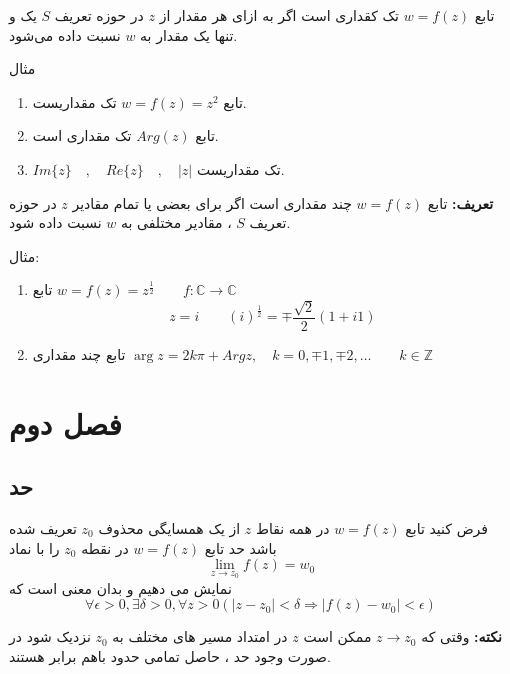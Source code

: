 \documentclass[12pt]{report}
\begin{document}
	 	 	 	 تابع 
	 	 	 	 $w = f(z)$
	 	 	 	 تک کقداری است اگر به ازای هر مقدار از 
	 	 	 	 $z$
	 	 	 	 در حوزه تعریف 
	 	 	 	 $S$
	 	 	 	 یک و تنها یک  مقدار  به 
	 	 	 	 $w$
	 	 	 	 نسبت داده می‌شود.
	 	 	 	 
	 	 	 	 مثال
	 	 	 	 \begin{enumerate}
	 	 	 	 	\item 
	 	 	 	 	تابع
	 	 	 	 	$w=f(z) = z^2$
	 	 	 	 	تک مقداریست.
	 	 	 	 	\item
	 	 	 	 	تابع 
	 	 	 	 	$Arg(z)$
	 	 	 	 	تک مقداری است.
	 	 	 	 	\item
	 	 	 	 	$Im\{z\} \quad, \quad Re\{z\} \quad , \quad |z|$
	 	 	 	 	تک مقداریست.
	 	 	 	 	
	 	 	 	 \end{enumerate}
 	 	 	 \textbf{تعریف:}
 	 	 	 تابع 
 	 	 	 $w = f(z)$
 	 	 	 چند مقداری است اگر برای بعضی یا تمام مقادیر 
 	 	 	 $z$
 	 	 	 در حوزه تعریف
 	 	 	 $S$
 	 	 	 ،
 	 	 	 مقادیر مختلفی به 
 	 	 	 $w$
 	 	 	 نسبت داده شود.
 	 	 	 
 	 	 	 مثال:
 	 	 	 \begin{enumerate}
 	 	 	 	\item 
 	 	 	 	تابع 
 	 	 	 	$w = f(z) = z^{\frac{1}{2}}\qquad f: \mathbb{C} \rightarrow \mathbb{C}$
 	 	 	 	$$z = i \qquad (i)^{\frac{1}{2}} = \mp \frac{\sqrt{2}}{2}(1 + i1)$$
 	 	 	 	\item
 	 	 	 	تابع چند مقداری
 	 	 	 	$\arg z  = 2k \pi + Arg z , \quad k= 0, \mp1, \mp 2 , \dots \qquad k \in \mathbb{Z}$
 	 	 	 	
 	 	 	 \end{enumerate}
  	 	 \chapter{فصل دوم}
  	 	 \section{حد}
 	 	 	 
	 	 	 	  فرض کنید تابع 
	 	 	 	  $w = f(z)$
	 	 	 	  در همه نقاط 
	 	 	 	  $z$
	 	 	 	  از یک همسایگی محذوف 
	 	 	 	  $z_0$
	 	 	 	  تعریف شده باشد حد تابع 
	 	 	 	  $w = f(z)$
	 	 	 	  در نقطه 
	 	 	 	  $z_0$
	 	 	 	  را با نماد 
	 	 	 	  $$\lim_{z \to z_0} f(z) = w_0$$
	 	 	 	  نمایش می دهیم و بدان معنی است که 
	 	 	 	  $$\forall \epsilon > 0 , \exists \delta > 0 , \forall z > 0 (|z - z_0| < \delta \Rightarrow |f(z) - w_0| < \epsilon)$$
	 	 	 	  
	 	 	 	  \textbf{نکته:}
	 	 	 	  وقتی که 
	 	 	 	  $z \to z_0$
	 	 	 	  ممکن است 
	 	 	 	  $z$
	 	 	 	  در امتداد مسیر های مختلف به 
	 	 	 	  $z_0$
	 	 	 	  نزدیک شود در صورت وجود حد
	 	 	 	  ،
	 	 	 	  حاصل تمامی حدود باهم برابر هستند.
	 	 	 	  \newline
	 	 	 	  
\end{document}
